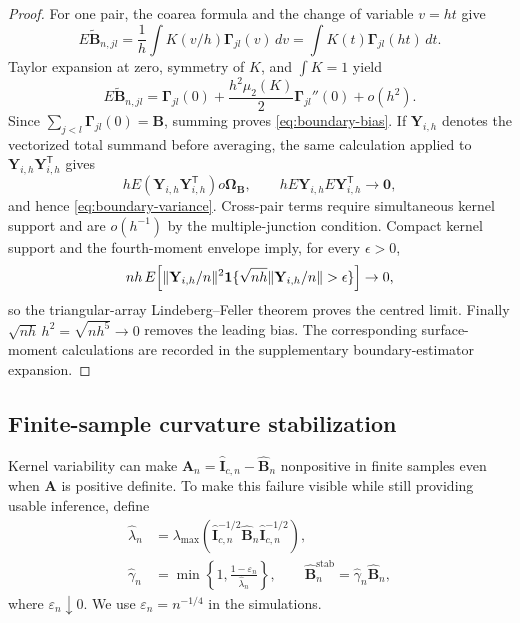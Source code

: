 \begin{proof}
For one pair, the coarea formula and the change of variable $v=ht$ give
\[
 E\widetilde{\mathbf B}_{n,jl}
 =\frac1h\int K(v/h)\boldsymbol\Gamma_{jl}(v)\,dv
 =\int K(t)\boldsymbol\Gamma_{jl}(ht)\,dt.
\]
Taylor expansion at zero, symmetry of $K$, and $\int K=1$ yield
\[
 E\widetilde{\mathbf B}_{n,jl}
 =\boldsymbol\Gamma_{jl}(0)+\frac{h^2\mu_2(K)}2
 \boldsymbol\Gamma_{jl}''(0)+o(h^2).
\]
Since $\sum_{j<l}\boldsymbol\Gamma_{jl}(0)=\mathbf B$, summing proves
\eqref{eq:boundary-bias}. If $\mathbf Y_{i,h}$ denotes the vectorized total
summand before averaging, the same calculation applied to
$\mathbf Y_{i,h}\mathbf Y_{i,h}^\mathsf T$ gives
\[
 hE(\mathbf Y_{i,h}\mathbf Y_{i,h}^\mathsf T)	o
 \boldsymbol\Omega_{\mathbf B},\qquad
 hE\mathbf Y_{i,h}E\mathbf Y_{i,h}^\mathsf T\to\mathbf0,
\]
and hence \eqref{eq:boundary-variance}. Cross-pair terms require simultaneous
kernel support and are $o(h^{-1})$ by the multiple-junction condition.
Compact kernel support and the fourth-moment envelope imply, for every
$\epsilon>0$,
\[
 nh\,E\!\left[\|\mathbf Y_{i,h}/n\|^2
 \ind\{\sqrt{nh}\|\mathbf Y_{i,h}/n\|>\epsilon\}\right]\to0,
\]
so the triangular-array Lindeberg--Feller theorem proves the centred limit.
Finally $\sqrt{nh}\,h^2=\sqrt{nh^5}\to0$ removes the leading bias. The
corresponding surface-moment calculations are recorded in the supplementary
boundary-estimator expansion.
\end{proof}

\subsection{Finite-sample curvature stabilization}

Kernel variability can make
$\widehat{\mathbf{A}}_n=\widehat{\mathbf{I}}_{c,n}-
\widehat{\mathbf B}_n$ nonpositive in finite samples even when
$\mathbf{A}$ is positive definite.  To make this failure visible while still
providing usable inference, define
\begin{align}
 \widehat\lambda_n
 &=\lambda_{\max}\!\left(
 \widehat{\mathbf I}_{c,n}^{-1/2}
 \widehat{\mathbf B}_n
 \widehat{\mathbf I}_{c,n}^{-1/2}\right),                 \label{eq:relative-boundary-eigenvalue}\\
 \widehat\gamma_n
 &=\min\left\{1,\frac{1-\varepsilon_n}{\widehat\lambda_n}\right\},
 \qquad
 \widehat{\mathbf B}_n^{\mathrm{stab}}
 =\widehat\gamma_n\widehat{\mathbf B}_n,                 \label{eq:boundary-stabilization}
\end{align}
where $\varepsilon_n\downarrow0$.  We use
$\varepsilon_n=n^{-1/4}$ in the simulations.

